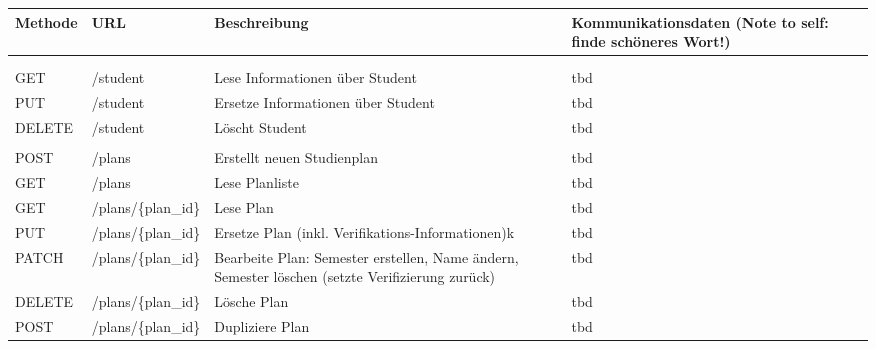 \begin{tabularx}{\textwidth}{@{} | X | X | X | X | @{}}
	\hline
	\textbf{Methode} & \textbf{URL} & \textbf{Beschreibung} & \textbf{\hspace{0pt}Kommunikationsdaten (Note to self: finde schöneres Wort!)} \\ \hline  \hline
	\\ \hline
	& & & \\ \hline
	GET & /student & Lese Informationen über Student & tbd	\\ \hline
	PUT & /student & Ersetze Informationen über Student & tbd
	\\ \hline
	DELETE & /student & Löscht Student & tbd \\ \hline
	& & & \\ \hline
	POST & /plans & Erstellt neuen Studienplan & tbd \\ \hline
	GET & /plans & Lese Planliste & tbd \\ \hline
	GET & /plans/\{plan\_id\} & Lese Plan & tbd \\ \hline
	PUT & /plans/\{plan\_id\} & Ersetze Plan (inkl. Verifikations-Informationen)k & tbd \\ \hline
	PATCH & /plans/\{plan\_id\} & Bearbeite Plan: Semester erstellen, Name ändern, Semester löschen (setzte Verifizierung zurück) & tbd \\ \hline
	DELETE & /plans/\{plan\_id\} & Lösche Plan & tbd \\ \hline
	POST & /plans/\{plan\_id\} & Dupliziere Plan & tbd \\ \hline
\end{tabularx}
